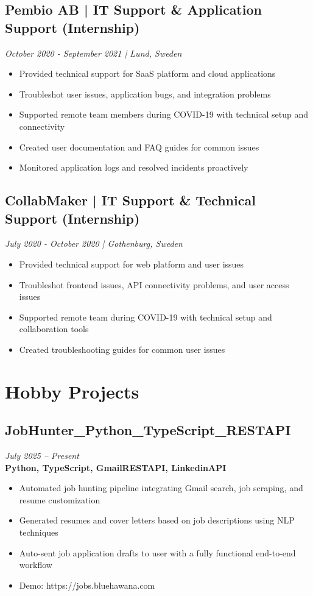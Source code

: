 \documentclass[11pt,a4paper]{article}
\begin{document}
\subsection*{Pembio AB | IT Support \& Application Support (Internship)}
\textit{October 2020 - September 2021 | Lund, Sweden}
\begin{itemize}[noitemsep]
\item Provided technical support for SaaS platform and cloud applications
\item Troubleshot user issues, application bugs, and integration problems
\item Supported remote team members during COVID-19 with technical setup and connectivity
\item Created user documentation and FAQ guides for common issues
\item Monitored application logs and resolved incidents proactively
\end{itemize}

\subsection*{CollabMaker | IT Support \& Technical Support (Internship)}
\textit{July 2020 - October 2020 | Gothenburg, Sweden}
\begin{itemize}[noitemsep]
\item Provided technical support for web platform and user issues
\item Troubleshot frontend issues, API connectivity problems, and user access issues
\item Supported remote team during COVID-19 with technical setup and collaboration tools
\item Created troubleshooting guides for common user issues
\end{itemize}

\section*{Hobby Projects}
\subsection{JobHunter\_Python\_TypeScript\_RESTAPI}
\textit{July 2025 -- Present} \\
\textbf{Python, TypeScript, GmailRESTAPI, LinkedinAPI}
\begin{itemize}
\item Automated job hunting pipeline integrating Gmail search, job scraping, and resume customization
\item Generated resumes and cover letters based on job descriptions using NLP techniques
\item Auto-sent job application drafts to user with a fully functional end-to-end workflow
\item Demo: https://jobs.bluehawana.com
\end{itemize}
\end{document}
